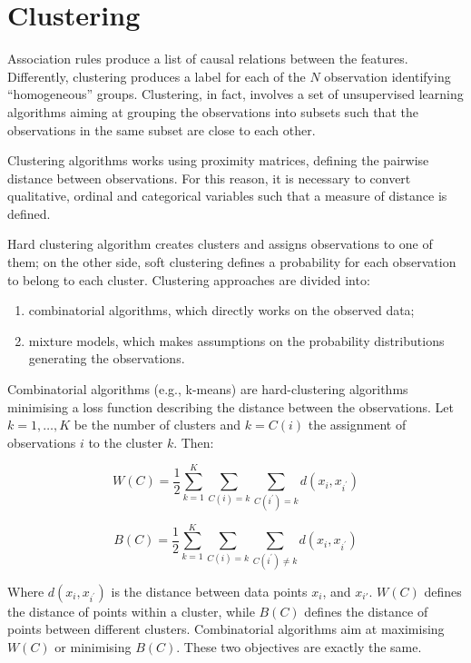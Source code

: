 \section{Clustering} \label{secClustering}
Association rules produce a list of causal relations between the features. Differently, clustering produces a label for each of the $N$ observation identifying “homogeneous” groups. Clustering, in fact, involves a set of unsupervised learning algorithms aiming at grouping the observations into subsets such that the observations in the same subset are close to each other. \par
Clustering algorithms works using proximity matrices, defining the pairwise distance between observations. For this reason, it is necessary to convert qualitative, ordinal and categorical variables such that a measure of distance is defined. \par
Hard clustering algorithm creates clusters and assigns observations to one of them; on the other side, soft clustering defines a probability for each observation to belong to each cluster. Clustering approaches are divided into:
\begin{enumerate}
    \item combinatorial algorithms, which directly works on the observed data;
    \item mixture models, which makes assumptions on the probability distributions generating the observations.
\end{enumerate}

Combinatorial algorithms (e.g., k-means) are hard-clustering algorithms minimising a loss function describing the distance between the observations. Let $k=1,\ldots,K$ be the number of clusters and $k=C(i)$ the assignment of observations $i$ to the cluster $k$. Then:

\begin{equation}
W\left(C\right)=\frac{1}{2}\sum_{k=1}^{K}\sum_{C\left(i\right)=k}\sum_{C\left(i^\prime\right)=k}{d(x_i,x_{i^\prime})}
\label{eq_clustering1}
\end{equation}

\begin{equation}
B\left(C\right)=\frac{1}{2}\sum_{k=1}^{K}\sum_{C\left(i\right)=k}\sum_{C\left(i^\prime\right)\neq k}{d(x_i,x_{i^\prime})}
\label{eq_clustering2}
\end{equation}

Where $d(x_i,x_{i^\prime})$ is the distance between data points $x_i$, and $x_{i'}$. $W(C)$ defines the distance of points within a cluster, while $B(C)$ defines the distance of points between different clusters. Combinatorial algorithms aim at maximising $W(C)$ or minimising $B(C)$. These two objectives are exactly the same.


